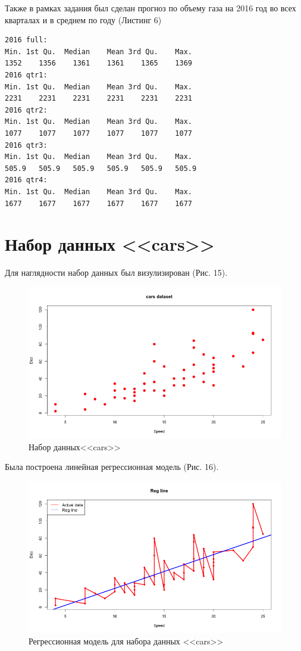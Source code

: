 \documentclass[]{article}
\numberwithin{equation}{section}
\begin{document}
    Также в рамках задания был сделан прогноз по объему газа на 2016 год во всех кварталах и в среднем по году (Листинг 6)
    \vspace{-0.1cm}
    \begin{lstlisting}[style = TEXTstyle, caption = Прогноз на 2016 год]
2016 full:
Min. 1st Qu.  Median    Mean 3rd Qu.    Max.
1352    1356    1361    1361    1365    1369
2016 qtr1:
Min. 1st Qu.  Median    Mean 3rd Qu.    Max.
2231    2231    2231    2231    2231    2231
2016 qtr2:
Min. 1st Qu.  Median    Mean 3rd Qu.    Max.
1077    1077    1077    1077    1077    1077
2016 qtr3:
Min. 1st Qu.  Median    Mean 3rd Qu.    Max.
505.9   505.9   505.9   505.9   505.9   505.9
2016 qtr4:
Min. 1st Qu.  Median    Mean 3rd Qu.    Max.
1677    1677    1677    1677    1677    1677
    \end{lstlisting}

    \section{Набор данных <<cars>>}
    Для наглядности набор данных был визулизирован (Рис. 15).

    \begin{figure}[H]
        \centering
        \includegraphics[width = 0.9\linewidth]{data/cars_data.png}
        \caption{Набор данных<<cars>>}
    \end{figure}

    Была построена линейная регрессионная модель (Рис. 16).

    \begin{figure}[H]
        \centering
        \includegraphics[width = 0.9\linewidth]{data/cars_reg_line.png}
        \caption{Регрессионная модель для набора данных <<cars>>}
    \end{figure}
\end{document}
